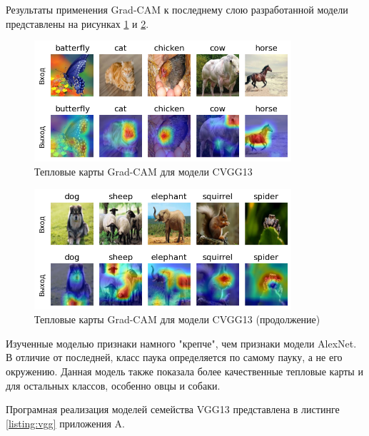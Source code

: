 Результаты применения Grad-CAM к последнему слою разработанной модели представлены на рисунках \ref{fig:cvgg13_gradcam_1} и \ref{fig:cvgg13_gradcam_2}.
\begin{figure}[h]
    \centering
    \includegraphics[width=0.85\textwidth]{images/cvgg13_out_1.png}
    \caption{Тепловые карты Grad-CAM для модели CVGG13}
    \label{fig:cvgg13_gradcam_1}
\end{figure}
\newpage
\begin{figure}[h]
    \centering
    \includegraphics[width=0.85\textwidth]{images/cvgg13_out_2.png}
    \caption{Тепловые карты Grad-CAM для модели CVGG13 (продолжение)}
    \label{fig:cvgg13_gradcam_2}
\end{figure}

Изученные моделью признаки намного "крепче", чем признаки модели AlexNet.
В отличие от последней, класс паука определяется по самому пауку, а не его окружению.
Данная модель также показала более качественные тепловые карты и для остальных классов, особенно овцы и собаки.

Програмная реализация моделей семейства VGG13 представлена в листинге \ref{listing:vgg} приложения A.
